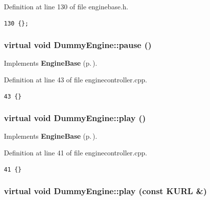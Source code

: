Definition at line 130 of file enginebase.h.



\footnotesize\begin{verbatim}130 {};
\end{verbatim}\normalsize 
{}
\subsubsection{\setlength{\rightskip}{0pt plus 5cm}virtual void Dummy\-Engine::pause ()\hspace{0.3cm}{\tt  [inline, private, virtual]}}\label{classDummyEngine_DummyEngined10}




Implements {\bf Engine\-Base} {\rm (p.\,\pageref{classEngineBase_EngineBasei3})}.

Definition at line 43 of file enginecontroller.cpp.



\footnotesize\begin{verbatim}43 {}
\end{verbatim}\normalsize 
{}
\subsubsection{\setlength{\rightskip}{0pt plus 5cm}virtual void Dummy\-Engine::play ()\hspace{0.3cm}{\tt  [inline, private, virtual]}}\label{classDummyEngine_DummyEngined8}




Implements {\bf Engine\-Base} {\rm (p.\,\pageref{classEngineBase_EngineBasei1})}.

Definition at line 41 of file enginecontroller.cpp.



\footnotesize\begin{verbatim}41 {}
\end{verbatim}\normalsize 
{}
\subsubsection{\setlength{\rightskip}{0pt plus 5cm}virtual void Dummy\-Engine::play (const KURL \&)\hspace{0.3cm}{\tt  [inline, private, virtual]}}\label{classDummyEngine_DummyEngined7}




